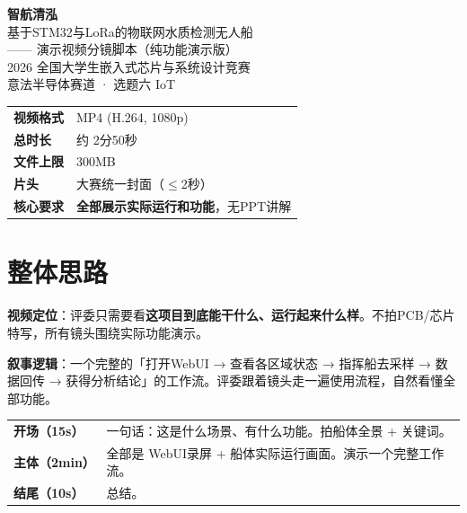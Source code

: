 \documentclass[12pt,a4paper]{article}
\begin{document}
\begin{center}
\vspace*{1.5cm}
{\LARGE\bfseries 智航清泓}\\[0.4cm]
{\Large 基于STM32与LoRa的物联网水质检测无人船}\\[0.3cm]
{\large —— 演示视频分镜脚本（纯功能演示版）}\\[1.2cm]

{\large 2026 全国大学生嵌入式芯片与系统设计竞赛}\\[0.2cm]
{\large 意法半导体赛道 · 选题六 IoT}\\[2cm]

\begin{minipage}{0.6\textwidth}
\renewcommand{\arraystretch}{1.3}
\begin{tabular}{>{\bfseries}l p{7cm}}
  \hline
  视频格式 & MP4 (H.264, 1080p) \\
  总时长 & 约 2分50秒 \\
  文件上限 & 300MB \\
  片头 & 大赛统一封面（$\le$2秒）\\
  核心要求 & \textbf{全部展示实际运行和功能}，无PPT讲解 \\
  \hline
\end{tabular}
\end{minipage}
\vspace*{2cm}
\end{center}

\newpage

\section{整体思路}

\textbf{视频定位}：评委只需要看\textbf{这项目到底能干什么、运行起来什么样}。不拍PCB/芯片特写，所有镜头围绕实际功能演示。

\textbf{叙事逻辑}：一个完整的「打开WebUI → 查看各区域状态 → 指挥船去采样 → 数据回传 → 获得分析结论」的工作流。评委跟着镜头走一遍使用流程，自然看懂全部功能。

\begin{center}
\renewcommand{\arraystretch}{1.5}
\begin{tabular}{>{\bfseries}p{3cm}p{12cm}}
  \toprule
  \textbf{开场（15s）} & 一句话：这是什么场景、有什么功能。拍船体全景 + 关键词。\\
  \textbf{主体（2min）} & 全部是 WebUI录屏 + 船体实际运行画面。演示一个完整工作流。\\
  \textbf{结尾（10s）} & 总结。\\
  \bottomrule
\end{tabular}
\end{center}
\end{document}
